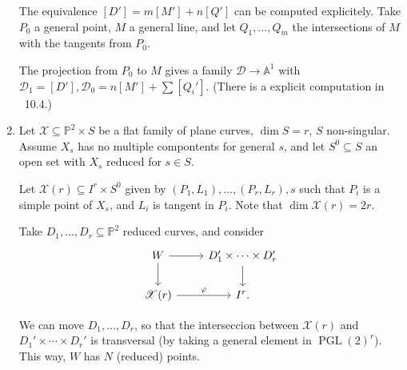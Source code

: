 \documentclass[leqno, openany]{memoir}
\theoremstyle{definition}
\theoremstyle{remark}
\theoremstyle{plain}
\theoremstyle{definition}
\theoremstyle{remark}
\renewcommand{\P}{\mathbb{P}}
\newcommand{\msc}[1]{\mathscr{#1}}
\begin{document}
\begin{enumerate}
The equivalence $[D']=m[M']+n[Q']$ can be computed explicitely. Take $P_0$ a general point, $M$ a general line, and let $Q_1, \dots, Q_m$ the intersections of $M$ with the tangents from $P_0$.
\begin{figure}[H]
\centering
{}
\end{figure}

The projection from $P_0$ to $M$ gives a family $\mathscr{D} \to \mathbb{A}^1$ with $\mathscr{D}_1=[D'], \mathscr{D}_0 = n[M']+\sum [Q_i']$. (There is a explicit computation in \textsection~10.4.) 
    \item Let $\mathscr{X} \subseteq \P^2 \times S$ be a flat family of plane curves, $\dim S=r$, $S$ non-singular. Assume $X_s$ has no multiple compontents for general $s$, and let $S^0 \subseteq S$ an open set with $X_s$ reduced for $s \in S$. 

Let $\msc{X}(r)\subseteq I^r \times S^0$ given by $(P_1, L_1), \dots, (P_r, L_r), s$ such that $P_i$ is a simple point of $X_s$, and $L_i$ is tangent in $P_i$. Note that $\dim \msc{X}(r)=2r$.

Take $D_1, \dots, D_r \subseteq \P^2$ reduced curves, and consider
\[ \begin{tikzcd} W \arrow[r] \arrow[d] & D_1' \times \cdots \times D_r' \arrow[d] \\ \msc{X}(r) \arrow[r, "\varphi"] & I^r. \end{tikzcd} \]

We can move $D_1, \dots, D_r$, so that the interseccion between $\msc{X}(r)$ and $D_1' \times \cdots \times D_r'$ is transversal (by taking a general element in ${ \operatorname{PGL}(2) }^r$). This way, $W$ has $N$ (reduced) points. 


\end{enumerate}
\end{document}
